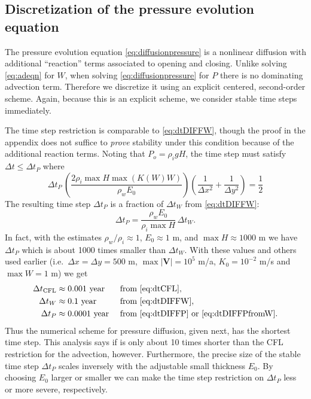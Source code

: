 \documentclass[11pt,final]{amsart}%
\newcommand\bV{\mathbf{V}}
\begin{document}
\subsection*{Discretization of the pressure evolution equation}  The pressure evolution equation \eqref{eq:diffusionpressure} is a nonlinear diffusion with additional ``reaction'' terms associated to opening and closing.  Unlike solving \eqref{eq:adeqn} for $W$, when solving \eqref{eq:diffusionpressure} for $P$ there is no dominating advection term.  Therefore we discretize it using an explicit centered, second-order scheme.  Again, because this is an explicit scheme, we consider stable time steps immediately.

The time step restriction is comparable to \eqref{eq:dtDIFFW}, though the proof in the appendix does not suffice to \emph{prove} stability under this condition because of the additional reaction terms.  Noting that $P_o=\rho_i g H$, the time step must satisfy $\Delta t \le \Delta t_P$ where
\begin{equation}
\Delta t_P\, \left(\frac{2 \rho_i \max H \max(K(W) W)}{\rho_w E_0}\right) \left(\frac{1}{\Delta x^2} + \frac{1}{\Delta y^2}\right) = \frac{1}{2} \label{eq:dtDIFFP}
\end{equation}
The resulting time step $\Delta t_P$ is a fraction of $\Delta t_W$ from \eqref{eq:dtDIFFW}:
\begin{equation}
\Delta t_P = \frac{\rho_w E_0}{\rho_i \max H}\, \Delta t_W.  \label{eq:dtDIFFPfromW}
\end{equation}
In fact, with the estimates $\rho_w/\rho_i \approx 1$, $E_0\approx 1$ m, and $\max H \approx 1000$ m we have $\Delta t_P$ which is about 1000 times smaller than $\Delta t_W$.  With these values and others used earlier (i.e.~$\Delta x = \Delta y = 500$ m, $\max |\bV|=10^5$ m/a, $K_0=10^{-2}$ m/s and $\max W=1$ m) we get
\begin{align*}
  \Delta t_{\text{CFL}} &\approx 0.001  \text{ year} &&\text{ from \eqref{eq:dtCFL}}, \\
  \Delta t_W            &\approx 0.1    \text{ year} &&\text{ from \eqref{eq:dtDIFFW}}, \\
  \Delta t_P            &\approx 0.0001 \text{ year} &&\text{ from \eqref{eq:dtDIFFP} or \eqref{eq:dtDIFFPfromW}.}
\end{align*}
Thus the numerical scheme for pressure diffusion, given next, has the shortest time step.  This analysis says if is only about 10 times shorter than the CFL restriction for the advection, however.  Furthermore, the precise size of the stable time step $\Delta t_P$ scales inversely with the adjustable small thickness $E_0$.  By choosing $E_0$ larger or smaller we can make the time step restriction on $\Delta t_P$ less or more severe, respectively.
\end{document}
